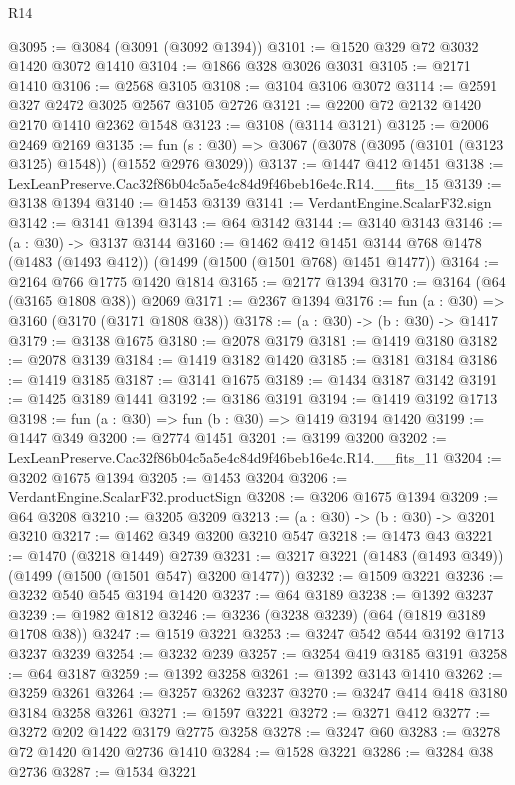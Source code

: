 \begin{lexlean}{R14}
\begin{coremodule}
@3095 := @3084 (@3091 (@3092 @1394))
@3101 := @1520 @329 @72 @3032 @1420 @3072 @1410
@3104 := @1866 @328 @3026 @3031
@3105 := @2171 @1410
@3106 := @2568 @3105
@3108 := @3104 @3106 @3072
@3114 := @2591 @327 @2472 @3025 @2567 @3105 @2726
@3121 := @2200 @72 @2132 @1420 @2170 @1410 @2362 @1548
@3123 := @3108 (@3114 @3121)
@3125 := @2006 @2469 @2169
@3135 := fun (s : @30) => @3067 (@3078 (@3095 (@3101 (@3123 @3125) @1548)) (@1552 @2976 @3029))
@3137 := @1447 @412 @1451
@3138 := LexLeanPreserve.Cac32f86b04c5a5e4c84d9f46beb16e4c.R14.__fits_15
@3139 := @3138 @1394
@3140 := @1453 @3139
@3141 := VerdantEngine.ScalarF32.sign
@3142 := @3141 @1394
@3143 := @64 @3142
@3144 := @3140 @3143
@3146 := (a : @30) -> @3137 @3144
@3160 := @1462
    @412
    @1451
    @3144
    @768
    @1478
    (@1483 (@1493 @412))
    (@1499 (@1500 (@1501 @768) @1451 @1477))
@3164 := @2164 @766 @1775 @1420 @1814
@3165 := @2177 @1394
@3170 := @3164 (@64 (@3165 @1808 @38)) @2069
@3171 := @2367 @1394
@3176 := fun (a : @30) => @3160 (@3170 (@3171 @1808 @38))
@3178 := (a : @30) -> (b : @30) -> @1417
@3179 := @3138 @1675
@3180 := @2078 @3179
@3181 := @1419 @3180
@3182 := @2078 @3139
@3184 := @1419 @3182 @1420
@3185 := @3181 @3184
@3186 := @1419 @3185
@3187 := @3141 @1675
@3189 := @1434 @3187 @3142
@3191 := @1425 @3189 @1441
@3192 := @3186 @3191
@3194 := @1419 @3192 @1713
@3198 := fun (a : @30) => fun (b : @30) => @1419 @3194 @1420
@3199 := @1447 @349
@3200 := @2774 @1451
@3201 := @3199 @3200
@3202 := LexLeanPreserve.Cac32f86b04c5a5e4c84d9f46beb16e4c.R14.__fits_11
@3204 := @3202 @1675 @1394
@3205 := @1453 @3204
@3206 := VerdantEngine.ScalarF32.productSign
@3208 := @3206 @1675 @1394
@3209 := @64 @3208
@3210 := @3205 @3209
@3213 := (a : @30) -> (b : @30) -> @3201 @3210
@3217 := @1462 @349 @3200 @3210 @547
@3218 := @1473 @43
@3221 := @1470 (@3218 @1449) @2739
@3231 := @3217 @3221 (@1483 (@1493 @349)) (@1499 (@1500 (@1501 @547) @3200 @1477))
@3232 := @1509 @3221
@3236 := @3232 @540 @545 @3194 @1420
@3237 := @64 @3189
@3238 := @1392 @3237
@3239 := @1982 @1812
@3246 := @3236 (@3238 @3239) (@64 (@1819 @3189 @1708 @38))
@3247 := @1519 @3221
@3253 := @3247 @542 @544 @3192 @1713 @3237 @3239
@3254 := @3232 @239
@3257 := @3254 @419 @3185 @3191
@3258 := @64 @3187
@3259 := @1392 @3258
@3261 := @1392 @3143 @1410
@3262 := @3259 @3261
@3264 := @3257 @3262 @3237
@3270 := @3247 @414 @418 @3180 @3184 @3258 @3261
@3271 := @1597 @3221
@3272 := @3271 @412
@3277 := @3272 @202 @1422 @3179 @2775 @3258
@3278 := @3247 @60
@3283 := @3278 @72 @1420 @1420 @2736 @1410
@3284 := @1528 @3221
@3286 := @3284 @38 @2736
@3287 := @1534 @3221

\end{coremodule}
\end{lexlean}
